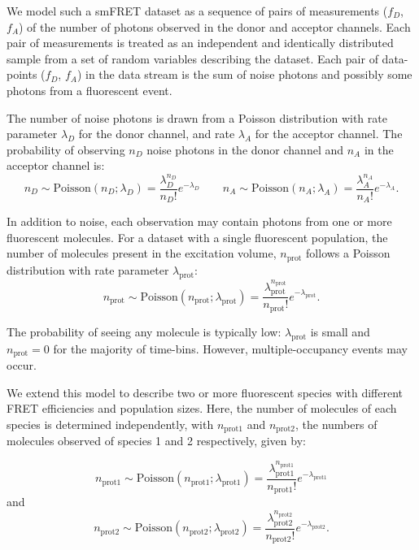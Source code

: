 We model such a smFRET dataset as a sequence of pairs of measurements ($f_D$, $f_A$) of the number of photons observed in the donor and acceptor channels. Each pair of measurements is treated as an independent and identically distributed sample from a set of random variables describing the dataset. Each pair of data-points ($f_D$, $f_A$) in the data stream is the sum of noise photons and possibly some photons from a fluorescent event. 

The number of noise photons is drawn from a Poisson distribution with rate parameter $\lambda_D$ for the donor channel, and rate $\lambda_A$ for the acceptor channel. The probability of observing $n_D$ noise photons in the donor channel and $n_A$ in the acceptor channel is:
\begin{equation}
n_{D} \sim \text{Poisson}(n_{D}; \lambda_{D}) = \frac{\lambda_{D}^{n_{D}}}{n_{D}!}e^{-\lambda_{D}}
\qquad
n_{A} \sim \text{Poisson}(n_{A}; \lambda_{A}) = \frac{\lambda_{A}^{n_{A}}}{n_{A}!}e^{-\lambda_{A}}.
\end{equation}

In addition to noise, each observation may contain photons from one or more fluorescent molecules. For a dataset with a single fluorescent population, the number of molecules present in the excitation volume, $n_{\text{prot}}$ follows a Poisson distribution with rate parameter $\lambda_{\text{prot}}$:
\begin{equation}
n_{\text{prot}} \sim \text{Poisson}(n_{\text{prot}}; \lambda_{\text{prot}}) = \frac{\lambda_{\text{prot}}^{n_{\text{prot}}}}{n_{\text{prot}}!}e^{-\lambda_{\text{prot}}}.
\label{eq:nprot}
\end{equation}

The probability of seeing any molecule is typically low: $\lambda_{\text{prot}}$ is small and $n_{\text{prot}} = 0$ for the majority of time-bins. However, multiple-occupancy events may occur.

We extend this model to describe two or more fluorescent species with different FRET efficiencies and population sizes. Here, the number of molecules of each species is determined independently, with $n_{\text{prot1}}$ and $n_{\text{prot2}}$, the numbers of molecules observed of species 1 and 2 respectively, given by:

\begin{equation}
n_{\text{prot1}} \sim \text{Poisson}(n_{\text{prot1}}; \lambda_{\text{prot1}}) = \frac{\lambda_{\text{prot1}}^{n_{\text{prot1}}}}{n_{\text{prot1}}!}e^{-\lambda_{\text{prot1}}}
\end{equation}
and
\begin{equation}
n_{\text{prot2}} \sim \text{Poisson}(n_{\text{prot2}}; \lambda_{\text{prot2}}) = \frac{\lambda_{\text{prot2}}^{n_{\text{prot2}}}}{n_{\text{prot2}}!}e^{-\lambda_{\text{prot2}}}.
\end{equation}

